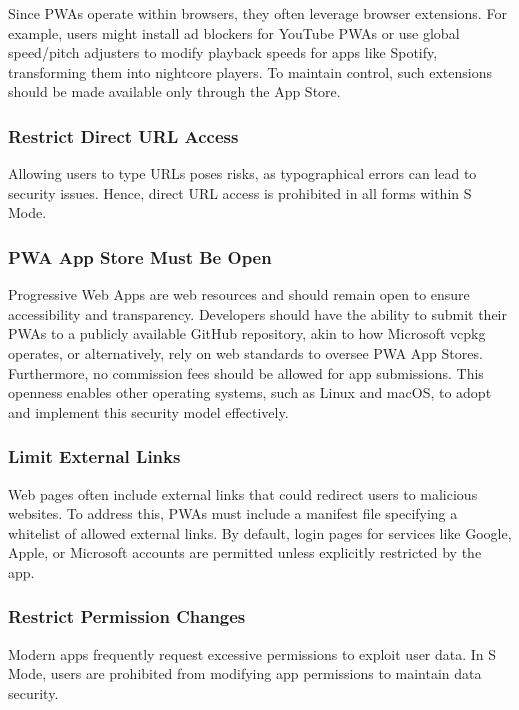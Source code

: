 Since PWAs operate within browsers, they often leverage browser extensions. For example, users might install ad blockers for YouTube PWAs or use global speed/pitch adjusters to modify playback speeds for apps like Spotify, transforming them into nightcore players. To maintain control, such extensions should be made available only through the App Store.

\subsubsection{Restrict Direct URL Access}

Allowing users to type URLs poses risks, as typographical errors can lead to security issues. Hence, direct URL access is prohibited in all forms within S Mode.

\subsubsection{PWA App Store Must Be Open}

Progressive Web Apps are web resources and should remain open to ensure accessibility and transparency. Developers should have the ability to submit their PWAs to a publicly available GitHub repository, akin to how Microsoft vcpkg operates, or alternatively, rely on web standards to oversee PWA App Stores. Furthermore, no commission fees should be allowed for app submissions. This openness enables other operating systems, such as Linux and macOS, to adopt and implement this security model effectively.

\subsubsection{Limit External Links}

Web pages often include external links that could redirect users to malicious websites. To address this, PWAs must include a manifest file specifying a whitelist of allowed external links. By default, login pages for services like Google, Apple, or Microsoft accounts are permitted unless explicitly restricted by the app.

\subsubsection{Restrict Permission Changes}

Modern apps frequently request excessive permissions to exploit user data. In S Mode, users are prohibited from modifying app permissions to maintain data security.

